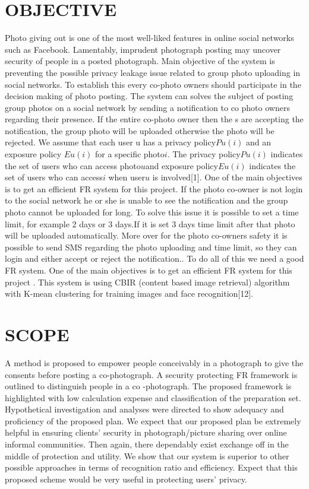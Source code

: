 \section[Objective]{\fontsize{14}{12}\selectfont OBJECTIVE}
Photo giving out is one of the most well-liked features in online social networks such as Facebook. Lamentably, imprudent photograph posting may uncover security of people in a posted photograph. Main objective of the system is preventing the possible privacy leakage issue related to group photo uploading in social networks. To establish this every co-photo owners should participate in the decision making of photo posting. The system can solves the subject of posting group photos on a social network by sending a notification to co photo owners regarding their presence. If the entire co-photo owner then the s are accepting the notification, the group photo will be uploaded otherwise the photo will be rejected.  We assume that each user u has a privacy policy$ Pu(i)$ and an exposure policy $Eu(i)$ for a specific photo$ i$. The privacy policy$ Pu(i)$ indicates the set of users who can access photo$ u $and exposure policy$ Eu(i)$ indicates the set of users who can access$ i$ when user$ u$ is involved[1]. One of the main objectives is to get an   efficient FR system for this project. If the photo co-owner is not login to the social network he or she is unable to see the notification and the group photo cannot be uploaded for long. To solve this issue it is possible to set a time limit, for example 2 days or 3 days.If it is set 3 days time limit after that photo will be uploaded automatically. More over for the photo co-owners safety it is possible to send SMS regarding the photo uploading and time limit, so they can login and either accept or reject the notification.. To do all of this we need a good FR system.  One of the main objectives is to get an   efficient FR system for this project . This system is using CBIR (content based image retrieval) algorithm with K-mean clustering for training images and face recognition[12].
\section[Scope]{\fontsize{14}{12}\selectfont SCOPE}
A method is proposed to empower people conceivably in a photograph to give the consents before posting a co-photograph. A security protecting FR framework is outlined to distinguish people in a co -photograph. The proposed framework is highlighted with low calculation expense and classification of the preparation set. Hypothetical investigation and analyses were directed to show adequacy and proficiency of the proposed plan. We expect that our proposed plan be extremely helpful in ensuring clients' security in photograph/picture sharing over online informal communities. Then again, there dependably exist exchange off in the middle of protection and utility. We show that our system is superior to  other possible approaches in terms of recognition ratio and efficiency. Expect that this proposed scheme would be very useful in protecting users’ privacy.
